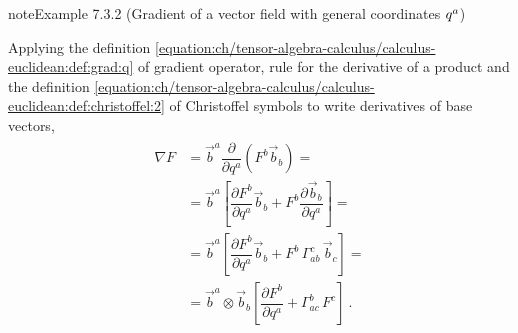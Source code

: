 \documentclass[letterpaper,10pt,english]{jupyterBook}
\begin{document}
\begin{sphinxadmonition}{note}{Example 7.3.2 (Gradient of a vector field \sphinxhyphen{} with general coordinates \protect\(q^{a}\protect\))}



\sphinxAtStartPar
Applying the definition \eqref{equation:ch/tensor-algebra-calculus/calculus-euclidean:def:grad:q} of gradient operator, rule for the derivative of a product and the definition \eqref{equation:ch/tensor-algebra-calculus/calculus-euclidean:def:christoffel:2} of Christoffel symbols to write derivatives of base vectors,
\begin{equation*}
\begin{split}\begin{aligned}
  \nabla F 
  & = \vec{b}^a \dfrac{\partial}{\partial q^a} \left( F^b \vec{b}_b \right) = \\
  & = \vec{b}^a \left[ \dfrac{\partial F^b}{\partial q^a} \vec{b}_b + F^b \dfrac{\partial \vec{b}_b}{\partial q^a} \right] = \\
  & = \vec{b}^a \left[ \dfrac{\partial F^b}{\partial q^a} \vec{b}_b + F^b \, \Gamma_{ab}^c \, \vec{b}_c \right] = \\
  & = \vec{b}^a \otimes \vec{b}_b \left[ \dfrac{\partial F^b}{\partial q^a} + \Gamma_{ac}^b \, F^c \right] \ .
\end{aligned}\end{split}
\end{equation*}\end{sphinxadmonition}
\label{ch/tensor-algebra-calculus/calculus-euclidean:example-6}
\end{document}
